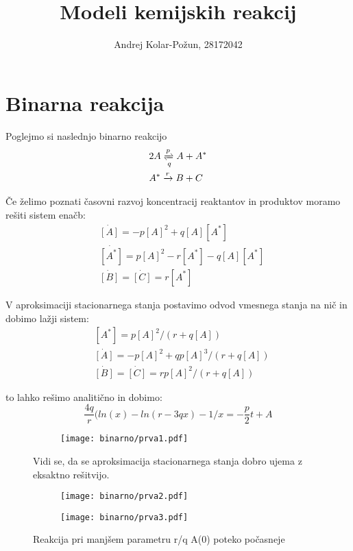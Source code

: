\documentclass{article}
\title{Modeli kemijskih reakcij}
\author{Andrej Kolar-Požun, 28172042}
\begin{document}
\maketitle
\newpage
{}
\section{Binarna reakcija}

Poglejmo si naslednjo binarno reakcijo
\begin{align*}
&2A \xrightleftharpoons[q]{p} A + A^* \\
&A^* \xrightarrow{r} B + C
\end{align*}

Če želimo poznati časovni razvoj koncentracij reaktantov in produktov moramo rešiti sistem enačb:
\begin{align*}
&\dot{[A]} = -p[A]^2 +q[A][A^*] \\
&\dot{[A^*]} = p[A]^2 - r[A^*] - q[A][A^*]\\
&\dot{[B]} = \dot{[C]} = r[A^*]
\end{align*}

V aproksimaciji stacionarnega stanja postavimo odvod vmesnega stanja na nič in dobimo lažji sistem:
\begin{align*}
&[A^*] = p[A]^2 / (r+q[A]) \\
&\dot{[A]} = -p[A]^2 + qp[A]^3/(r+q[A]) \\
&\dot{[B]} = \dot{[C]} =  rp[A]^2/(r+q[A])
\end{align*}

to lahko rešimo analitično in dobimo:
\begin{equation*}
\frac{4q}{r}(ln(x) - ln(r-3 q x) - 1/x = -\frac{p}{2}t + A
\end{equation*}


\begin{figure}[H]
\centering
\begin{subfigure}{\textwidth}
\texttt{[image: binarno/prva1.pdf]}
\end{subfigure}
\caption*{Vidi se, da se aproksimacija stacionarnega stanja dobro ujema z eksaktno rešitvijo.}
\end{figure}
\begin{figure}[H]
\centering
\begin{subfigure}{.49\textwidth}
\texttt{[image: binarno/prva2.pdf]}
\end{subfigure}
\begin{subfigure}{.49\textwidth}
\texttt{[image: binarno/prva3.pdf]}
\end{subfigure}
\caption*{Reakcija pri manjšem parametru r/q A(0) poteko počasneje}
\end{figure}
\end{document}
